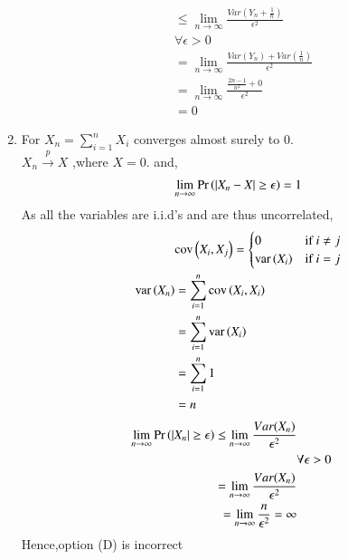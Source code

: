 \documentclass[journal,12pt,Twocolumn]{IEEEtran}
\theoremstyle{remark}
\begin{document}
\begin{enumerate}[label=(\Alph*)]
\begin{align}
&\leq \lim_{n \to \infty} \frac{Var(Y_n +\frac{1}{n})}{\epsilon^2} \\
& \forall \epsilon > 0 \\
&=\lim_{n \to \infty} \frac{Var(Y_n)+Var(\frac{1}{n})}{\epsilon^2} \\
&=\lim_{n \to \infty} \frac{\frac{2n-1}{n^2}+0}{\epsilon^2} \\
&= 0
\end{align} 
\item For $X_n = \sum_{i=1}^n X_i$ converges almost surely to $0$. \\
$X_n \xrightarrow{p} X$ ,where $X=0$.
and,
\begin{align}
\lim_{n \to \infty} \Pr\left(|X_n - X| \geq  \epsilon\right) = 1 
\end{align}
As all the variables are i.i.d's and are thus uncorrelated,
\begin{align}
&\text{cov}\left(X_i, X_j\right) =
\begin{cases}
	0 & \text{if } i \ne j\\
    \text{var}\left(X_i\right) & \text{if } i = j
\end{cases} \\
\text{var}\left(X_n\right)&=\sum_{i=1}^{n}\text{cov}\left(X_i, X_i\right) \\
&= \sum_{i=1}^{n} \text{var}\left(X_i\right)\\
&= \sum_{i=1}^{n} 1\\
&= n
\end{align}
\begin{align}
\lim_{n \to \infty} \Pr\left(|X_n| \geq  \epsilon\right)  
\leq \lim_{n \to \infty} \frac{Var(X_n)}{\epsilon^2} \\
& \forall \epsilon > 0 \\
=\lim_{n \to \infty} \frac{Var(X_n)}{\epsilon^2} \\
=\lim_{n \to \infty} \frac{n}{\epsilon^2} = \infty
\end{align} 
Hence,option (D) is incorrect
\end{enumerate}
\end{document}
